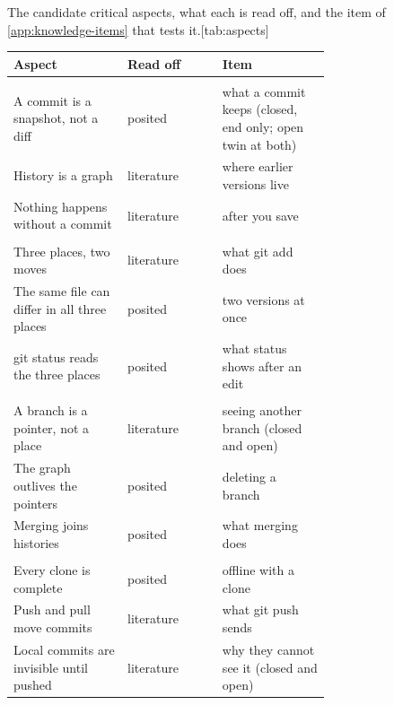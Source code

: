 \begin{table}
  \begin{sidecaption}{The candidate critical aspects, what each is read
    off, and the item of \cref{app:knowledge-items} that tests
    it.}[tab:aspects]
    \small
    \begin{tabular}{@{}>{\raggedright\arraybackslash}p{0.36\linewidth}l>{\raggedright\arraybackslash}p{0.34\linewidth}@{}}
      \toprule
      Aspect & Read off & Item \\
      \midrule
      \multicolumn{3}{@{}l}{\emph{The commit model} (\cref{sec:model-aspects})} \\
      A commit is a snapshot, not a diff & posited & what a commit keeps (closed, end only; open twin at both) \\
      History is a graph & literature & where earlier versions live \\
      Nothing happens without a commit & literature & after you save \\
      \addlinespace
      \multicolumn{3}{@{}l}{\emph{The staging area} (\cref{sec:staging-aspects})} \\
      Three places, two moves & literature & what git add does \\
      The same file can differ in all three places & posited & two versions at once \\
      git status reads the three places & posited & what status shows after an edit \\
      \addlinespace
      \multicolumn{3}{@{}l}{\emph{Branches} (\cref{sec:branches-aspects})} \\
      A branch is a pointer, not a place & literature & seeing another branch (closed and open) \\
      The graph outlives the pointers & posited & deleting a branch \\
      Merging joins histories & posited & what merging does \\
      \addlinespace
      \multicolumn{3}{@{}l}{\emph{Remotes} (\cref{sec:remotes-aspects})} \\
      Every clone is complete & posited & offline with a clone \\
      Push and pull move commits & literature & what git push sends \\
      Local commits are invisible until pushed & literature & why they cannot see it (closed and open) \\
      \bottomrule
    \end{tabular}
  \end{sidecaption}
\end{table}

